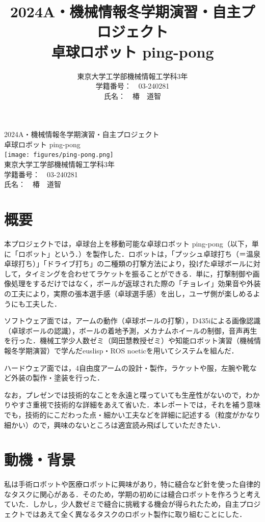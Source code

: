 \documentclass[10pt, oneside, titlepage]{ltjarticle}  %
\title{ \large{2024A・機械情報冬学期演習・自主プロジェクト}\\
\vspace{1cm}
\Huge{卓球ロボット ping-pong}}
\author{東京大学工学部機械情報工学科3年 \\
学籍番号：　03-240281 \\
氏名：　椿　道智}
\begin{document}
\begin{titlepage}
  \begin{center}
  \Large{2024A・機械情報冬学期演習・自主プロジェクト}\\
  \vspace{1cm}
  \Huge{卓球ロボット ping-pong}\\
  \vspace{1cm}
  \texttt{[image: figures/ping-pong.png]}\\
  \vspace{2cm}
  \Large{
  東京大学工学部機械情報工学科3年\\
  学籍番号：　03-240281\\
  氏名：　椿　道智
  }
  \end{center}
\end{titlepage}
\section{概要}
本プロジェクトでは，卓球台上を移動可能な卓球ロボット ping-pong（以下，単に「ロボット」という．）を製作した．ロボットは，「プッシュ卓球打ち（＝温泉卓球打ち）」「ドライブ打ち」の二種類の打撃方法により，投げた卓球ボールに対して，タイミングを合わせてラケットを振ることができる．単に，打撃制御や画像処理をするだけではなく，ボールが返球された際の「チョレイ」効果音や外装の工夫により，実際の張本選手感（卓球選手感）を出し，ユーザ側が楽しめるようにも工夫した．

ソフトウェア面では，アームの動作（卓球ボールの打撃），D435iによる画像認識（卓球ボールの認識），ボールの着地予測，メカナムホイールの制御，音声再生を行った．機械工学少人数ゼミ（岡田慧教授ゼミ）や知能ロボット演習（機械情報冬学期演習）で学んだeuslisp・ROS noeticを用いてシステムを組んだ．

ハードウェア面では，4自由度アームの設計・製作，ラケットや服，左腕や靴など外装の製作・塗装を行った．

なお，プレゼンでは技術的なことを永遠と喋っていても生産性がないので，わかりやすさ重視で技術的な詳細をあえて省いた．本レポートでは，それを補う意味でも，技術的にこだわった点・細かい工夫などを詳細に記述する（粒度がかなり細かい）ので，興味のないところは適宜読み飛ばしていただきたい．

\section{動機・背景}
私は手術ロボットや医療ロボットに興味があり，特に縫合など針を使った自律的なタスクに関心がある．そのため，学期の初めには縫合ロボットを作ろうと考えていた．しかし，少人数ゼミで縫合に挑戦する機会が得られたため，自主プロジェクトではあえて全く異なるタスクのロボット製作に取り組むことにした．
\end{document}
